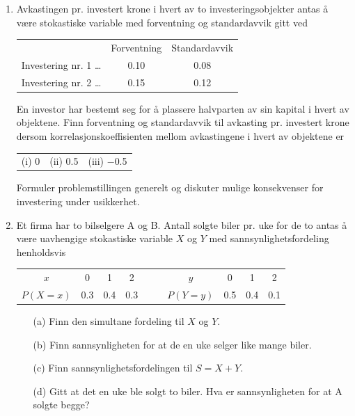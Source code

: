 \begin{enumerate}
\item Avkastingen pr. investert krone i hvert av to
     investeringsobjekter antas å være stokastiske variable med
     forventning og standardavvik gitt ved
     \begin{center}
      \begin{tabular}{lcc}
                                & Forventning &   Standardavvik\\
     Investering nr. 1 \ldots   &    0.10     &     0.08       \\
     Investering nr. 2 \dots    &    0.15     &     0.12
      \end{tabular}
     \end{center}
     En investor har bestemt seg for å plassere halvparten av sin
     kapital i hvert av objektene. Finn forventning og
     standardavvik til avkasting pr. investert krone dersom
     korrelasjonskoeffisienten mellom avkastingene i hvert av
     objektene er
     \begin{center}
      \begin{tabular}{ccc}
          (i) 0   &    (ii) 0.5   &    (iii) $-$0.5
      \end{tabular} 
     \end{center}
     Formuler problemstillingen generelt og diskuter mulige
     konsekvenser for investering under usikkerhet.

\item Et firma har to bilselgere A og B. Antall solgte biler pr.
     uke for de to antas å være uavhengige stokastiske variable
     $X$ og $Y$ med sannsynlighetsfordeling henholdsvis
     \begin{center}
     \begin{tabular}{c|cccccc|ccc}
      $x$& 0 & 1 & 2 & & &$y$& 0 & 1 & 2  \\ \cline{1-4} \cline{7-10}
      $P(X=x)$&0.3&0.4&0.3& & &$P(Y=y)$&0.5&0.4&0.1
     \end{tabular}
     \end{center}
     \begin{itemize}
     \item[(a)]  Finn den simultane fordeling til $X$ og $Y$.
     \item[(b)]  Finn sannsynligheten for at de en uke selger like mange
          biler.
     \item[(c)]  Finn sannsynlighetsfordelingen til $S=X+Y$.
     \item[(d)]  Gitt at det en uke ble solgt to biler. Hva er
     sannsynligheten for at A solgte begge?
     \end{itemize}


\end{enumerate}
